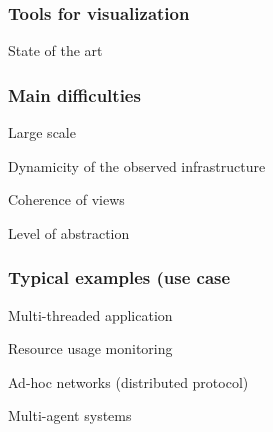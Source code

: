 \begin{frame}
\frametitle{Tools for visualization}
State of the art
\end{frame}

\begin{frame}
\frametitle{Main difficulties}
\begin{description}
\item Large scale
\item Dynamicity of the observed infrastructure
\item Coherence of views
\item Level of abstraction
\end{description}
\end{frame}

\begin{frame}
\frametitle{Typical examples (use case}
\begin{description}
\item Multi-threaded application
\item Resource usage monitoring
\item Ad-hoc networks (distributed protocol)
\item Multi-agent systems
\end{description}
\end{frame}